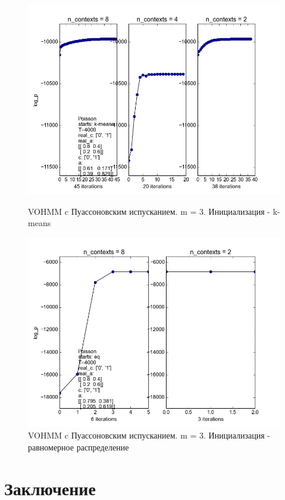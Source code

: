 \documentclass[10pt,a4paper]{article}
\begin{document}
\begin{figure}[ht]\centering
	\parbox[b]{ 0.49 \textwidth}{
	\includegraphics[scale=0.3]{img/poisson_2.jpg}
	\centering
	\caption{VOHMM c Пуассоновским испусканием.
	 m = 3. Инициализация - k-means}
	\label{ris:img_Poisson_3}
	
	}
\hfil \hfil%
\begin{minipage}[b]{0.49 \textwidth}
	\includegraphics[scale=0.3]{img/poisson_eq_2.jpg}
	\centering
	\caption{VOHMM c Пуассоновским испусканием. m = 3. Инициализация - равномерное распределение}
	\label{ris:img_Poisson_eq_3}
\end{minipage}
\end{figure}

\section{Заключение}



\end{document}
